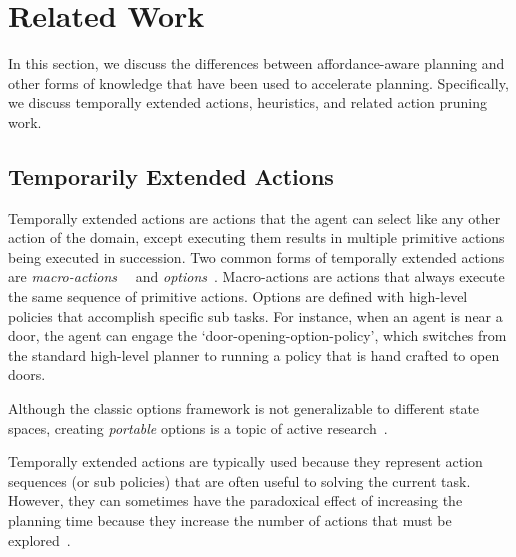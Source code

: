 \documentclass[conference]{IEEEtran}
\begin{document}
\section{Related Work}
\label{sec:related-work}

In this section, we discuss the differences between
affordance-aware planning and other forms of knowledge that
have been used to accelerate planning.  Specifically, we discuss
temporally extended actions, heuristics, and related action pruning
work.

\subsection{Temporarily Extended Actions}
Temporally extended actions are actions that the agent can
select like any other action of the domain, except executing them
results in multiple primitive actions being executed in
succession. Two common forms of temporally extended actions are {\em
  macro-actions}~\citep{hauskrecht98} ~and {\em options}~\citep{sutton99}. 
Macro-actions are actions that always
execute the same sequence of primitive actions. Options are defined
with high-level policies that accomplish specific sub tasks. For
instance, when an agent is near a door, the agent can engage the
`door-opening-option-policy', which switches from the standard
high-level planner to running a policy that is hand crafted to open
doors. 

Although the classic options framework is not generalizable to different state spaces,
creating {\em portable} options is a topic of active research~\citep{konidaris07,konidaris2009efficient,Ravindran03analgebraic,croonenborghs2008learning,andre2002state,konidaris2012transfer}.

Temporally extended actions are typically used
because they represent action sequences (or sub policies) that are often useful to solving
the current task. However, they can sometimes have the paradoxical effect
of increasing the planning time because they increase the number of actions that must be explored~\citep{Jong:2008zr}.
\end{document}
